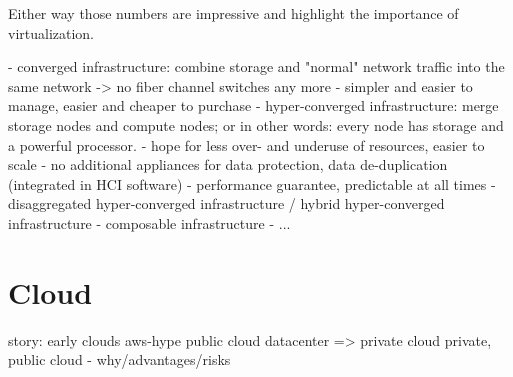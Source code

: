 Either way those numbers are impressive and highlight the importance of virtualization.


%


- converged infrastructure: combine storage and "normal" network traffic into the same network -> no fiber channel switches any more
  - simpler and easier to manage, easier and cheaper to purchase
- hyper-converged infrastructure: merge storage nodes and compute nodes; or in other words: every node has storage and a powerful processor.
  - hope for less over- and underuse of resources, easier to scale
  - no additional appliances for data protection, data de-duplication (integrated in HCI software)
  - performance guarantee, predictable at all times
- disaggregated hyper-converged infrastructure / hybrid hyper-converged infrastructure
- composable infrastructure
- ...




\section{Cloud}
story:
early clouds
aws-hype
public cloud
datacenter => private cloud
private, public cloud - why/advantages/risks




